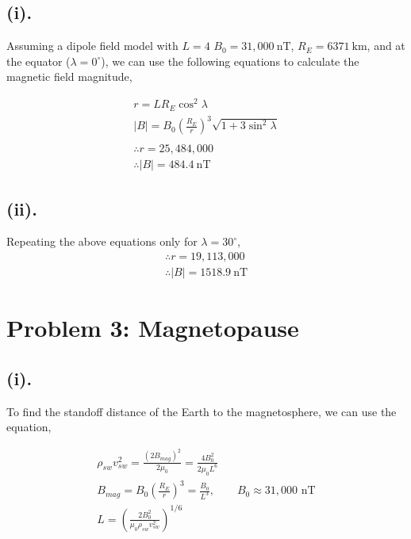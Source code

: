 \documentclass[11pt]{article}
\begin{document}
\subsection*{(i).}
\hspace*{2em}Assuming a dipole field model with $L=4$ $B_0 = 31,000~\mathrm{nT}$, $R_E = 6371~\mathrm{km}$, and at the equator ($\lambda=0^\circ$), we can use the following equations
to calculate the magnetic field magnitude,

\begin{gather*}
r = LR_E \cos^2 \lambda \\
|B| = B_{0} (\frac{R_E}{r})^3 \sqrt{1+3\sin^2\lambda}\\
\\
\therefore r = 25,484,000 \\
\boxed{\therefore |B| = 484.4~\mathrm{nT}}
\end{gather*}

\subsection*{(ii).}
\hspace*{2em}Repeating the above equations only for $\lambda = 30^\circ$,
\begin{gather*}
\therefore r = 19,113,000 \\
\boxed{\therefore |B| = 1518.9~\mathrm{nT}}
\end{gather*}

\newpage
\section*{Problem 3: Magnetopause}
\subsection*{(i).}
\hspace*{2em}To find the standoff distance of the Earth to the magnetosphere,
we can use the equation, 

\begin{gather*}
\rho_{sw} v_{sw}^2 = \frac{(2B_{mag})^2}{2\mu_0} = \frac{4B_0^2}{2\mu_0 L^6} \\
B_{mag} = B_0 \left(\frac{R_E}{r}\right)^3 = \frac{B_0}{L^3}, \qquad B_0 \approx 31{,}000 \text{ nT} \\
L = \left(\frac{2B_0^2}{\mu_0 \rho_{sw} v_{sw}^2}\right)^{1/6}
\end{gather*}
\end{document}
